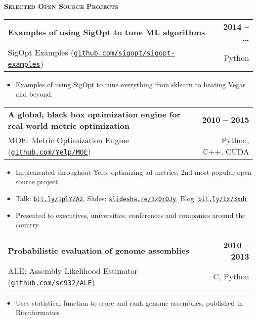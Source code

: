 \documentclass[letterpaper, 11pt]{article}
\makeatletter
\renewcommand{\section}[1]{%
  \begin{tcolorbox}
    \textsc{\textbf{\large{#1}}}
  \end{tcolorbox}
}
\newcommand{\entry}[4]{%
  \begin{tabularx}{\linewidth}{@{}Xr@{}}
    \textbf{#2} & \textbf{#1} \\
    #3          & #4          \\
  \end{tabularx}
}
\newcommand{\website}[1]{\href{http://#1}{\texttt{#1}}}
\makeatother
\begin{document}
  \section{Selected Open Source Projects}
  
  \entry{2014 -- \ldots}{Examples of using SigOpt to tune ML algorithms}{SigOpt Examples (\website{github.com/sigopt/sigopt-examples})}{Python}
  \begin{itemize}
    \item{Examples of using SigOpt to tune everything from sklearn to beating Vegas and beyond.}
  \end{itemize}

  \entry{2010 -- 2015}{A global, black box optimization engine for real world metric optimization}{MOE: Metric Optimization Engine (\website{github.com/Yelp/MOE})}{Python, C++, CUDA}
  \begin{itemize}
    \item{Implemented throughout Yelp, optimizing ad metrics. 2nd most popular open source project.}
    \item{Talk: \website{bit.ly/1plYZA2}, Slides: \website{slidesha.re/1zOrOJy}, Blog: \website{bit.ly/1x73xdr}}
    \item{Presented to executives, universities, conferences and companies around the country.}
  \end{itemize}

  \entry{2010 -- 2013}{Probabilistic evaluation of genome assemblies}{ALE: Assembly Likelihood Estimator (\website{github.com/sc932/ALE})}{C, Python}
  \begin{itemize}
    \item{Uses statistical function to score and rank genome assemblies, published in Bioinformatics}
  \end{itemize}
\end{document}

